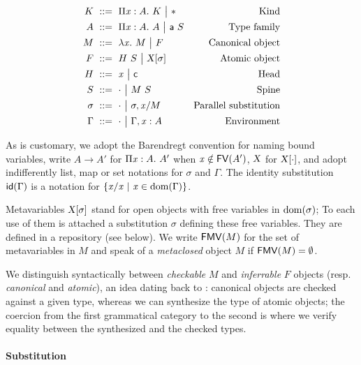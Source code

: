 \documentclass[9pt]{sigplanconf}
\begin{document}
\begin{align*}
  K &\ ::=\ 
  \Pi{\ensuremath{\text{\textit{x}}}}:{A}.\  K \ {\big|}\ 
  \mathsf{*} &
  \text{Kind}\\
  A &\ ::=\ 
  \Pi{\ensuremath{\text{\textit{x}}}}:{A}.\  A \ {\big|}\ 
  {\text{\textsf{a}}}\  S &
  \text{Type family} \\
  M &\ ::=\ 
  \lambda{\ensuremath{\text{\textit{x}}}}.\  M \ {\big|}\ 
  F &
  \text{Canonical object} \\
  F &\ ::=\  {H}\  S
  \ {\big|}\ 
  {\text{\textsl{X}}}[{\sigma}] &
  \text{Atomic object} \\
  H &\ ::=\ 
  \text{\textit{x}} \ {\big|}\ 
  \text{\textsf{c}} &
  \text{Head}\\
  S &\ ::=\ 
  \cdot \ {\big|}\ 
  {M}\ {S} &
  \text{Spine}\\
  \sigma &\ ::=\ 
  \cdot \ {\big|}\ 
  {\sigma},{{\text{\textit{x}}}/{M}} &
  \text{Parallel substitution} \\
  \Gamma &\ ::=\ 
  \cdot \ {\big|}\ 
  {\Gamma},{{\text{\textit{x}}}:{A}} &
  \text{Environment}
\end{align*}

As is customary, we adopt the Barendregt convention for naming bound
variables, write $A\to A'$ for $\Pi{\ensuremath{\text{\textit{x}}}}:{A}.\  A'$ when $\text{\textit{x}}\notin {\text{\textsf{FV}}}({A'})$,
$\text{\textsl{X}}$ for ${\text{\textsl{X}}}[{\cdot}]$, and adopt indifferently list, map
or set notations for $\sigma$ and $\Gamma$. The identity substitution
${\text{\textsf{id}}}({\Gamma})$ is a notation for $\{{\text{\textit{x}}}/{\text{\textit{x}}}\ |\ \text{\textit{x}}
\in\operatorname{dom}{\!(\Gamma)}\}$.

Metavariables ${\text{\textsl{X}}}[{\sigma}]$ stand for open objects with free
variables in $\operatorname{dom}{\!(\sigma)}$; To each use of them is attached a
substitution $\sigma$ defining these free variables. They are defined
in a repository (see below). We write ${\text{\textsf{FMV}}}({M})$ for the set of
metavariables in $M$ and speak of a \emph{metaclosed} object $M$ if
${\text{\textsf{FMV}}}({M}) = \emptyset$.

We distinguish syntactically between \emph{checkable} $M$ and
\emph{inferrable} $F$ objects (resp. \emph{canonical} and
\emph{atomic}), an idea dating back to \cite{pierce2000local}:
canonical objects are checked against a given type, whereas we can
synthesize the type of atomic objects; the coercion from the first
grammatical category to the second is where we verify equality between
the synthesized and the checked types.

\paragraph{Substitution}
\end{document}
